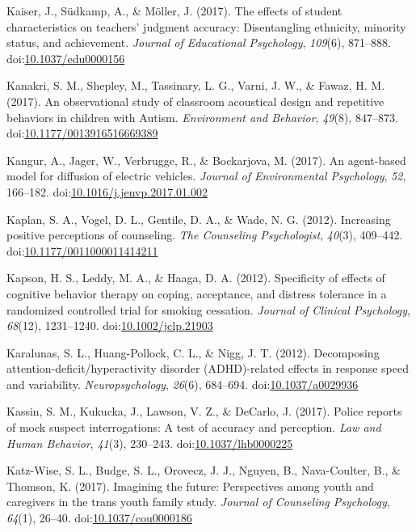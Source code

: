\documentclass[english,man]{apa6}
\theoremstyle{definition}
\theoremstyle{definition}
\theoremstyle{definition}
\theoremstyle{remark}
\begin{document}
\hypertarget{ref-Kaiser2017}{}
Kaiser, J., Südkamp, A., \& Möller, J. (2017). The effects of student
characteristics on teachers' judgment accuracy: Disentangling ethnicity,
minority status, and achievement. \emph{Journal of Educational
Psychology}, \emph{109}(6), 871--888.
doi:\href{https://doi.org/10.1037/edu0000156}{10.1037/edu0000156}

\hypertarget{ref-Kanakri2017}{}
Kanakri, S. M., Shepley, M., Tassinary, L. G., Varni, J. W., \& Fawaz,
H. M. (2017). An observational study of classroom acoustical design and
repetitive behaviors in children with Autism. \emph{Environment and
Behavior}, \emph{49}(8), 847--873.
doi:\href{https://doi.org/10.1177/0013916516669389}{10.1177/0013916516669389}

\hypertarget{ref-Kangur2017}{}
Kangur, A., Jager, W., Verbrugge, R., \& Bockarjova, M. (2017). An
agent-based model for diffusion of electric vehicles. \emph{Journal of
Environmental Psychology}, \emph{52}, 166--182.
doi:\href{https://doi.org/10.1016/j.jenvp.2017.01.002}{10.1016/j.jenvp.2017.01.002}

\hypertarget{ref-Kaplan2012}{}
Kaplan, S. A., Vogel, D. L., Gentile, D. A., \& Wade, N. G. (2012).
Increasing positive perceptions of counseling. \emph{The Counseling
Psychologist}, \emph{40}(3), 409--442.
doi:\href{https://doi.org/10.1177/0011000011414211}{10.1177/0011000011414211}

\hypertarget{ref-Kapson2012}{}
Kapson, H. S., Leddy, M. A., \& Haaga, D. A. (2012). Specificity of
effects of cognitive behavior therapy on coping, acceptance, and
distress tolerance in a randomized controlled trial for smoking
cessation. \emph{Journal of Clinical Psychology}, \emph{68}(12),
1231--1240.
doi:\href{https://doi.org/10.1002/jclp.21903}{10.1002/jclp.21903}

\hypertarget{ref-Karalunas2012}{}
Karalunas, S. L., Huang-Pollock, C. L., \& Nigg, J. T. (2012).
Decomposing attention-deficit/hyperactivity disorder (ADHD)-related
effects in response speed and variability. \emph{Neuropsychology},
\emph{26}(6), 684--694.
doi:\href{https://doi.org/10.1037/a0029936}{10.1037/a0029936}

\hypertarget{ref-Kassin2017}{}
Kassin, S. M., Kukucka, J., Lawson, V. Z., \& DeCarlo, J. (2017). Police
reports of mock suspect interrogations: A test of accuracy and
perception. \emph{Law and Human Behavior}, \emph{41}(3), 230--243.
doi:\href{https://doi.org/10.1037/lhb0000225}{10.1037/lhb0000225}

\hypertarget{ref-Katz-Wise2017}{}
Katz-Wise, S. L., Budge, S. L., Orovecz, J. J., Nguyen, B.,
Nava-Coulter, B., \& Thomson, K. (2017). Imagining the future:
Perspectives among youth and caregivers in the trans youth family study.
\emph{Journal of Counseling Psychology}, \emph{64}(1), 26--40.
doi:\href{https://doi.org/10.1037/cou0000186}{10.1037/cou0000186}
\end{document}
